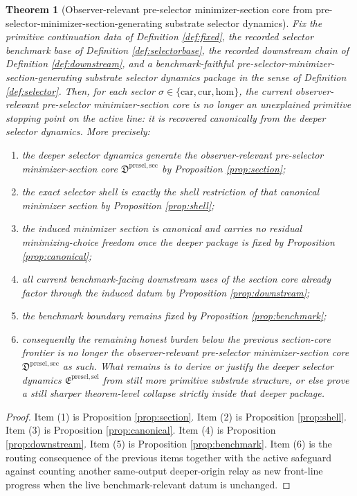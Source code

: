 \documentclass[11pt]{article}
\newcommand{\Car}{\mathrm{car}}
\newcommand{\Cur}{\mathrm{cur}}
\newcommand{\Hom}{\mathrm{hom}}
\newcommand{\PreSelectorMinSectionCore}{\mathfrak D^{\mathrm{presel,sec}}}
\newcommand{\PreSectionSelectorPackage}{\mathfrak E^{\mathrm{presel,sel}}}
\newtheorem{theorem}{Theorem}
\begin{document}
\begin{theorem}[Observer-relevant pre-selector minimizer-section core from pre-selector-minimizer-section-generating substrate selector dynamics]
\label{thm:main}
Fix the primitive continuation data of Definition \ref{def:fixed}, the recorded selector benchmark base of Definition \ref{def:selectorbase}, the recorded downstream chain of Definition \ref{def:downstream}, and a benchmark-faithful pre-selector-minimizer-section-generating substrate selector dynamics package in the sense of Definition \ref{def:selector}. Then, for each sector \(\sigma\in\{\Car,\Cur,\Hom\}\), the current observer-relevant pre-selector minimizer-section core is no longer an unexplained primitive stopping point on the active line: it is recovered canonically from the deeper selector dynamics. More precisely:
\begin{enumerate}
    \item the deeper selector dynamics generate the observer-relevant pre-selector minimizer-section core \(\PreSelectorMinSectionCore\) by Proposition \ref{prop:section};
    \item the exact selector shell is exactly the shell restriction of that canonical minimizer section by Proposition \ref{prop:shell};
    \item the induced minimizer section is canonical and carries no residual minimizing-choice freedom once the deeper package is fixed by Proposition \ref{prop:canonical};
    \item all current benchmark-facing downstream uses of the section core already factor through the induced datum by Proposition \ref{prop:downstream};
    \item the benchmark boundary remains fixed by Proposition \ref{prop:benchmark};
    \item consequently the remaining honest burden below the previous section-core frontier is no longer the observer-relevant pre-selector minimizer-section core \(\PreSelectorMinSectionCore\) as such. What remains is to derive or justify the deeper selector dynamics \(\PreSectionSelectorPackage\) from still more primitive substrate structure, or else prove a still sharper theorem-level collapse strictly inside that deeper package.
\end{enumerate}
\end{theorem}

\begin{proof}
Item (1) is Proposition \ref{prop:section}. Item (2) is Proposition \ref{prop:shell}. Item (3) is Proposition \ref{prop:canonical}. Item (4) is Proposition \ref{prop:downstream}. Item (5) is Proposition \ref{prop:benchmark}. Item (6) is the routing consequence of the previous items together with the active safeguard against counting another same-output deeper-origin relay as new front-line progress when the live benchmark-relevant datum is unchanged.
\end{proof}
\end{document}
